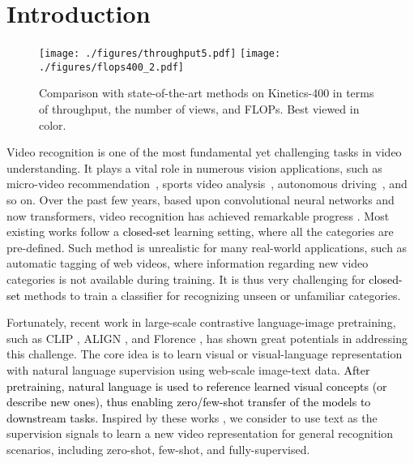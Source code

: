 \documentclass[runningheads]{llncs}
\begin{document}
\section{Introduction}

\begin{figure}
  \centering
  \texttt{[image: ./figures/throughput5.pdf]}
  \texttt{[image: ./figures/flops400\_2.pdf]}
  \caption{Comparison with state-of-the-art methods on Kinetics-400 \cite{k400} in terms of throughput, the number of views, and FLOPs. Best viewed in color.
  }
  \label{fig:throughputs_flops}
\end{figure}
 
Video recognition is one of the most fundamental yet challenging tasks in video understanding. It plays a vital role in numerous vision applications, such as micro-video recommendation~\cite{survey_action}, sports video analysis~\cite{survey_videotransformer}, autonomous driving~\cite{survey_action2}, and so on. Over the past few years, based upon convolutional neural networks and now transformers, video recognition has achieved remarkable progress \cite{survey_action,karpathy2014large}. Most existing works follow a \textcolor{black}{closed-set} learning setting, where all the categories are pre-defined. Such method is unrealistic for many real-world applications, such as automatic tagging of web videos, where information regarding new video categories is not available during training. It is thus very challenging for \textcolor{black}{closed-set} methods to train a classifier for recognizing unseen or unfamiliar categories.


Fortunately, recent work in large-scale contrastive language-image pretraining, such as CLIP \cite{clip}, ALIGN \cite{align}, and Florence \cite{florence}, has shown great potentials in addressing this challenge. The core idea is to learn visual or visual-language representation with natural language supervision using web-scale image-text data. \textcolor{black}{After pretraining, natural language is used to reference learned visual concepts (or describe new ones), thus enabling zero/few-shot transfer of the models to downstream tasks.} Inspired by these works \cite{clip,align,florence}, we consider to use text as the supervision signals to learn a new video representation for general recognition scenarios, including zero-shot, few-shot, and fully-supervised.
\end{document}
